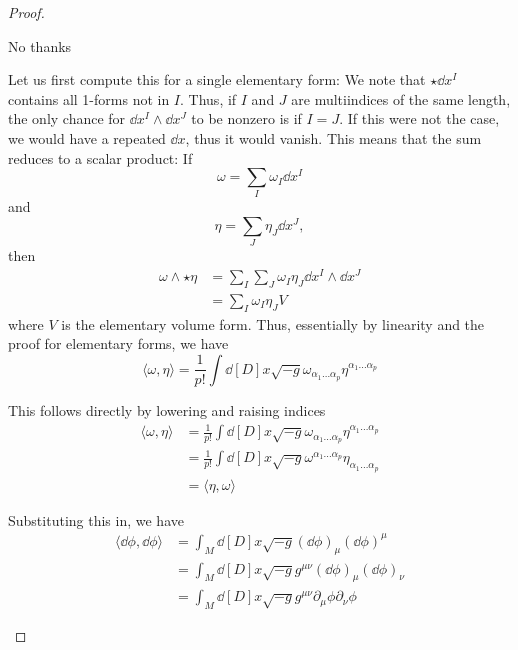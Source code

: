 \begin{proof}
	\begin{parts}
	\item No thanks
	\item Let us first compute this for a single elementary form: We note that $\star \dd{x^I}$ contains all 1-forms not in $I$. Thus, if $I$ and $J$ are multiindices of the same length, the only chance for $\dd{x^I}\wedge\dd{x^J}$ to be nonzero is if $I=J$. If this were not the case, we would have a repeated $\dd{x}$, thus it would vanish. This means that the sum reduces to a scalar product: If
	\[\omega = \sum_I \omega_I\dd{x^I}\]
	and
	\[\eta = \sum_J \eta_J \dd{x^J},\]
	then
	\begin{align*}
		\omega\wedge\star\eta &= \sum_I \sum_J\omega_I \eta_J \dd{x^I}\wedge\dd{x^J}\\
		&= \sum_I \omega_I\eta_J V
	\end{align*}
	where $V$ is the elementary volume form. Thus, essentially by linearity and the proof for elementary forms, we have
	\[\langle \omega, \eta\rangle = \frac 1{p!} \int \dd[D]{x} \sqrt{-g} \omega_{\alpha_1\dots\alpha_p}\eta^{\alpha_1\dots\alpha_p}\]
			\item This follows directly by lowering and raising indices
		\begin{align*}
			\langle \omega, \eta\rangle &= \frac{1}{p!}\int \dd[D]{x} \sqrt{-g} \omega_{\alpha_1\dots \alpha_p}\eta^{\alpha_1\dots \alpha_p}\\
			&= \frac{1}{p!}\int\dd[D]{x} \sqrt{-g} \omega^{\alpha_1\dots\alpha_p}\eta_{\alpha_1\dots \alpha_p} \\
			&=  \langle \eta, \omega\rangle
		\end{align*}
		\item Substituting this in, we have
		\begin{align*}
			\langle \dd{\phi}, \dd{\phi}\rangle &= \int_M \dd[D]{x} \sqrt{-g} (\dd{\phi})_\mu (\dd{\phi})^\mu\\
			&= \int_M \dd[D]{x} \sqrt{-g} g^{\mu\nu}(\dd{\phi})_\mu (\dd{\phi})_\nu \\
			&= \int_M \dd[D]{x} \sqrt{-g} g^{\mu\nu}\partial_\mu\phi\partial_\nu\phi
		\end{align*}
	\end{parts}
\end{proof}

